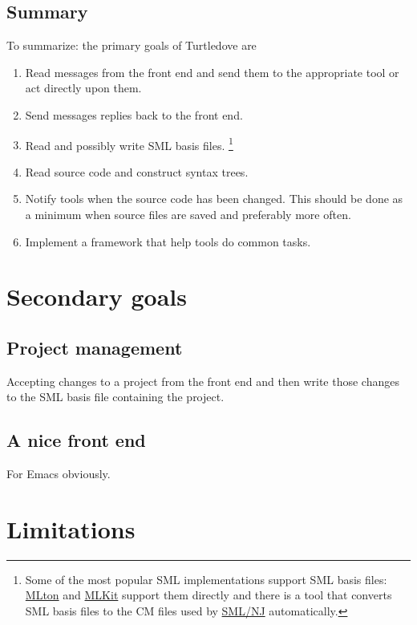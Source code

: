 \documentclass[a4paper,oneside]{article}
\begin{document}
\subsection{Summary}
To summarize: the primary goals of Turtledove are
\begin{enumerate}
\item Read messages from the front end and send them to the appropriate tool or
      act directly upon them.
  
\item Send messages replies back to the front end.

\item Read and possibly write SML basis files.
\footnote{Some of the most popular SML implementations support SML basis files:
\href{http://mlton.org/}{MLton} and \href{http://www.itu.dk/research/mlkit}{MLKit} support them
directly and there is a tool that converts SML basis files to the CM files used by
\href{http://smlnj.org}{SML/NJ} automatically.}

\item Read source code and construct syntax trees.

\item Notify tools when the source code has been changed. This should be done as a minimum when
      source files are saved and preferably more often.

\item Implement a framework that help tools do common tasks.
\end{enumerate}

\section{Secondary goals}

\subsection{Project management}
Accepting changes to a project from the front end and then write those changes to the SML basis file
containing the project.

\subsection{A nice front end}
For Emacs obviously.

\section{Limitations}
\end{document}
